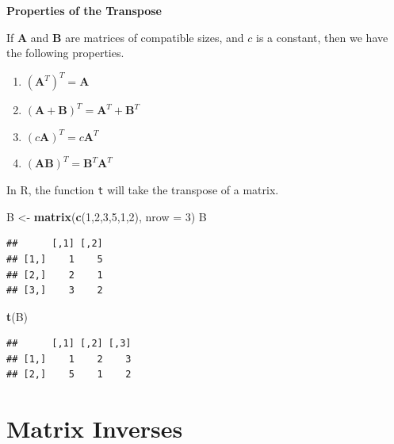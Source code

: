 \documentclass[
]{book}
\newenvironment{Shaded}{\begin{snugshade}}{\end{snugshade}}
\newcommand{\AttributeTok}[1]{\textcolor[rgb]{0.13,0.29,0.53}{#1}}
\newcommand{\DecValTok}[1]{\textcolor[rgb]{0.00,0.00,0.81}{#1}}
\newcommand{\FunctionTok}[1]{\textcolor[rgb]{0.13,0.29,0.53}{\textbf{#1}}}
\newcommand{\NormalTok}[1]{#1}
\newcommand{\OtherTok}[1]{\textcolor[rgb]{0.56,0.35,0.01}{#1}}
\theoremstyle{definition}
\theoremstyle{definition}
\theoremstyle{definition}
\theoremstyle{definition}
\theoremstyle{remark}
\begin{document}
\begin{propbox}

\textbf{Properties of the Transpose}

If \textbf{A} and \textbf{B} are matrices of compatible sizes, and \(c\) is a constant, then we have the following properties.

\begin{enumerate}
\def\labelenumi{\arabic{enumi}.}
\item
  \(\left(\textbf{A}^T\right)^T=\textbf{A}\)
\item
  \((\textbf{A}+\textbf{B})^T=\textbf{A}^T+\textbf{B}^T\)
\item
  \((c\textbf{A})^T=c\textbf{A}^T\)
\item
  \((\textbf{A}\textbf{B})^T=\textbf{B}^T\textbf{A}^T\)
\end{enumerate}

\end{propbox}

In R, the function \texttt{t} will take the transpose of a matrix.

\begin{Shaded}
\begin{Highlighting}[]
\NormalTok{B }\OtherTok{\textless{}{-}} \FunctionTok{matrix}\NormalTok{(}\FunctionTok{c}\NormalTok{(}\DecValTok{1}\NormalTok{,}\DecValTok{2}\NormalTok{,}\DecValTok{3}\NormalTok{,}\DecValTok{5}\NormalTok{,}\DecValTok{1}\NormalTok{,}\DecValTok{2}\NormalTok{), }\AttributeTok{nrow =} \DecValTok{3}\NormalTok{)}
\NormalTok{B}
\end{Highlighting}
\end{Shaded}

\begin{verbatim}
##      [,1] [,2]
## [1,]    1    5
## [2,]    2    1
## [3,]    3    2
\end{verbatim}

\begin{Shaded}
\begin{Highlighting}[]
\FunctionTok{t}\NormalTok{(B)}
\end{Highlighting}
\end{Shaded}

\begin{verbatim}
##      [,1] [,2] [,3]
## [1,]    1    2    3
## [2,]    5    1    2
\end{verbatim}

\section{Matrix Inverses}\label{Inverses}
\end{document}
